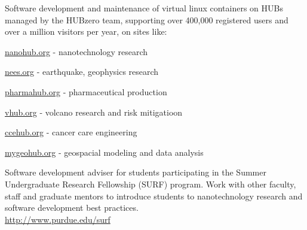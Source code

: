 \documentclass[10pt]{article}
\newcommand{\halfblankline}{\quad\vspace{-0.5\baselineskip}\pagebreak[3]}
\begin{document}
\begin{outerlist}
\begin{innerlist}
            \item Software development and maintenance of virtual
                linux containers on HUBs managed by the HUBzero team,
                supporting over 400,000 registered users and over a
                million visitors per year, on sites like:
                \begin{innerlist}
                    \item[] \href{https://nanohub.org}{nanohub.org}
                        - nanotechnology research
                    \item[] \href{https://nees.org}{nees.org}
                        - earthquake, geophysics research
                    \item[] \href{https://pharmahub.org}{pharmahub.org}
                        - pharmaceutical production
                    \item[] \href{https://vhub.org}{vhub.org}
                        - volcano research and risk mitigatioon
                    \item[] \href{https://ccehub.org}{ccehub.org}
                        - cancer care engineering
                    \item[] \href{https://mygeohub.org}{mygeohub.org}
                        - geospacial modeling and data analysis
                \end{innerlist}

            \item Software development adviser for students
                participating in the Summer Undergraduate Research Fellowship
                (SURF) program. Work with other faculty, staff and graduate
                mentors to introduce students to nanotechnology research and
                software development best practices. \\
                \url{http://www.purdue.edu/surf}

        \end{innerlist}
\end{outerlist}

\halfblankline
\end{document}
